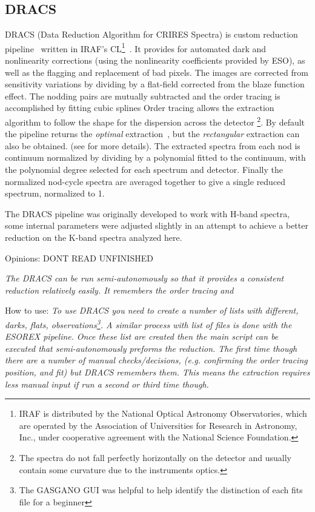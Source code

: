 \subsection{DRACS}
DRACS (Data Reduction Algorithm for CRIRES Spectra) is custom reduction pipeline~\citep{figueira_radial_2010} written in IRAF's CL\footnote{IRAF is distributed by the National Optical Astronomy Observatories, which are operated by the Association of Universities for Research in Astronomy, {Inc.}, under cooperative agreement with the National Science Foundation.}~\citep{tody_iraf_1993}. It provides for automated dark and nonlinearity corrections (using the nonlinearity coefficients provided by ESO), as well as the flagging and replacement of bad pixels. The images are corrected from sensitivity variations by dividing by a flat-field corrected from the blaze function effect. The nodding pairs are mutually subtracted and the order tracing is accomplished by fitting cubic splines
Order tracing allows the extraction algorithm to follow the shape for the dispersion across the detector \footnote{The spectra do not fall perfectly horizontally on the detector and usually contain some curvature due to the instruments optics.}. 
By default the pipeline returns the \emph{optimal }extraction~\citep{horne_optimal_1986}, but the \emph{rectangular} extraction can also be obtained. (see  for more details).
The extracted spectra from each nod is continuum normalized by dividing by a polynomial fitted to the continuum, with the polynomial degree selected for each spectrum and detector. Finally the normalized nod-cycle spectra are averaged together to give a single reduced spectrum, normalized to 1.

The DRACS pipeline was originally developed to work with H-band spectra, some internal parameters were adjusted slightly in an attempt to achieve a better reduction on the K-band spectra analyzed here.


Opinions:
DONT READ UNFINISHED 

\textit{The DRACS can be run semi-autonomously so that it provides a consistent reduction relatively easily. It remembers the order tracing and}

How to use:
\textit{To use DRACS you need to create a number of lists with different, darks, flats, observations\footnote{The GASGANO GUI was helpful to help identify the distinction of each fits file for a beginner}. A similar process with list of files is done with the ESOREX pipeline.}
\textit{Once these list are created then the main script can be executed that semi-autonomously preforms the reduction. The first time though there are a number of manual checks/decisions, (e.g. confirming the order tracing position, and fit) but DRACS remembers them. This means the extraction requires less manual input if run a second or third time though.}

